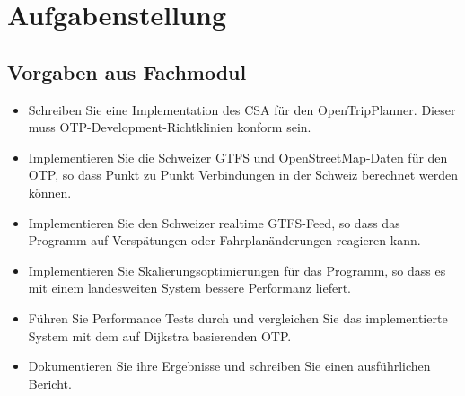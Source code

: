 \section{Aufgabenstellung}
\subsection{Vorgaben aus Fachmodul}
\label{AufgabenstellungBA}
\begin{itemize}
	\item Schreiben Sie eine Implementation des CSA für den OpenTripPlanner. Dieser muss OTP-Development-Richtklinien konform sein.
	\item Implementieren Sie die Schweizer GTFS und OpenStreetMap-Daten für den OTP, so dass Punkt zu Punkt Verbindungen in der Schweiz berechnet werden können.
	\item Implementieren Sie den Schweizer realtime GTFS-Feed, so dass das Programm auf Verspätungen oder Fahrplanänderungen reagieren kann.
	\item Implementieren Sie Skalierungsoptimierungen für das Programm, so dass es mit einem landesweiten System bessere Performanz liefert.
	\item Führen Sie Performance Tests durch und vergleichen Sie das implementierte System mit dem auf Dijkstra basierenden OTP.
	\item Dokumentieren Sie ihre Ergebnisse und schreiben Sie einen ausführlichen Bericht.
\end{itemize}

